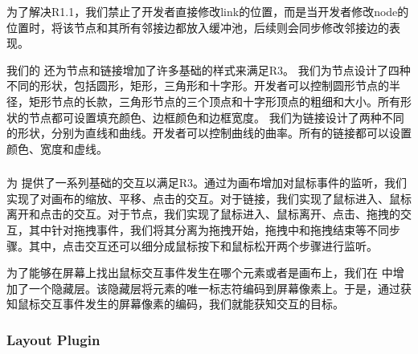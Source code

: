 为了解决R1.1，我们禁止了开发者直接修改link的位置，而是当开发者修改node的位置时，将该节点和其所有邻接边都放入缓冲池，后续则会同步修改邻接边的表现。

我们的 \RenEng 还为节点和链接增加了许多基础的样式来满足R3。
我们为节点设计了四种不同的形状，包括圆形，矩形，三角形和十字形。开发者可以控制圆形节点的半径，矩形节点的长款，三角形节点的三个顶点和十字形顶点的粗细和大小。所有形状的节点都可设置填充颜色、边框颜色和边框宽度。
我们为链接设计了两种不同的形状，分别为直线和曲线。开发者可以控制曲线的曲率。所有的链接都可以设置颜色、宽度和虚线。

\subsubsection{\IntMan}
\IntMan 为 \name 提供了一系列基础的交互以满足R3。通过为画布增加对鼠标事件的监听，我们实现了对画布的缩放、平移、点击的交互。对于链接，我们实现了鼠标进入、鼠标离开和点击的交互。对于节点，我们实现了鼠标进入、鼠标离开、点击、拖拽的交互，其中针对拖拽事件，我们将其分离为拖拽开始，拖拽中和拖拽结束等不同步骤。其中，点击交互还可以细分成鼠标按下和鼠标松开两个步骤进行监听。

为了能够在屏幕上找出鼠标交互事件发生在哪个元素或者是画布上，我们在 \RenEng 中增加了一个隐藏层。该隐藏层将元素的唯一标志符编码到屏幕像素上。于是，通过获知鼠标交互事件发生的屏幕像素的编码，我们就能获知交互的目标。

\subsubsection{Layout Plugin}





